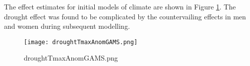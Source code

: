 \documentclass[a4paper]{article}                %
\begin{document}
        The effect estimates for initial models of climate are shown in Figure \ref{fig:droughtTmaxAnomGAMS.png}.  The drought effect was found to be complicated by the countervailing effects in men and women during subsequent modelling.
        \begin{figure}[!h]
        \centering
        \texttt{[image: droughtTmaxAnomGAMS.png]}
        \caption{droughtTmaxAnomGAMS.png}
        \label{fig:droughtTmaxAnomGAMS.png}
        \end{figure}
        \clearpage





\end{document}
